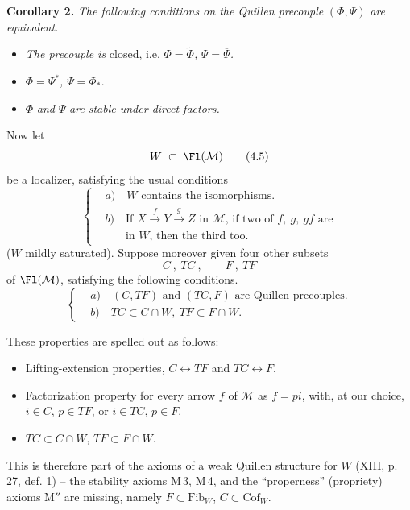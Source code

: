 \textbf{Corollary 2.} \textit{The following conditions on the Quillen precouple} $(\Phi,\Psi)$ \textit{are equivalent.}
\begin{itemize}[leftmargin=2.5em]
\item[a)] \textit{The precouple is} closed, i.e. $\Phi=\widetilde{\Phi}$\textit{,} $\Psi=\overline{\Psi}$\textit{.}
\item[b)] $\Phi=\Psi^*$\textit{,} $\Psi=\Phi_*$\textit{.}
\item[c)] $\Phi$ \textit{and} $\Psi$ \textit{are stable under direct factors.}
\end{itemize}
Now let
\[
W \;\subset\; \Fl(\mathcal{M})
\tag*{(4.5)}
\]
be a localizer, satisfying the usual conditions
\[
\left\{
\begin{aligned}
&\textit{a})\quad W \text{ contains the isomorphisms.}\\[1ex]
&\textit{b})\quad \text{If } X\xrightarrow{\;f\;}Y\xrightarrow{\;g\;}Z \text{ in } \mathcal{M}\text{, if two of } f,\ g,\ gf \text{ are}\\
&\phantom{\textit{b})}\quad \text{in } W\text{, then the third too.}
\end{aligned}
\right.
\tag*{(4.6)}
\]
($W$ mildly saturated). Suppose moreover given four other subsets
\[
C\ ,\ TC\ , \qquad F\ ,\ TF
\tag*{(4.7)}
\]
of $\Fl(\mathcal{M})$, satisfying the following conditions.
\[
\left\{
\begin{aligned}
&\textit{a})\quad (C,TF) \text{ and } (TC,F) \text{ are Quillen precouples.}\\[1ex]
&\textit{b})\quad TC\subset C\cap W,\ TF\subset F\cap W.
\end{aligned}
\right.
\tag*{(4.8)}
\]

These properties are spelled out as follows:
\begin{itemize}[leftmargin=2.5em]
\item[\textbf{M\,1}] Lifting-extension properties, $C\longleftrightarrow TF$ and $TC\longleftrightarrow F$.
\item[\textbf{M\,2}] Factorization property for every arrow $f$ of $\mathcal{M}$ as $f=pi$, with, at our choice, $i\in C$, $p\in TF$, or $i\in TC$, $p\in F$.
\item[\textbf{M$'$}] $TC\subset C\cap W$, $TF\subset F\cap W$.
\end{itemize}

This is therefore part of the axioms of a weak Quillen structure for $W$ (XIII, p. 27, def. 1) -- the stability axioms M\,3, M\,4, and the ``properness'' (propriety) axioms M$''$ are missing, namely $F\subset\mathrm{Fib}_W$, $C\subset\mathrm{Cof}_W$.

